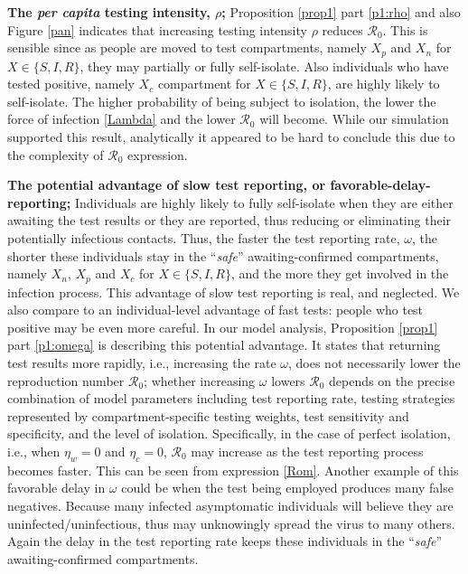 \documentclass[12pt]{article}
\newcommand{\percap}{\emph{per capita}\xspace}
\newcommand{\Rnum}{\mathcal{R}_0}
\theoremstyle{definition} %
\begin{document}
{\bf The \percap testing intensity, $\rho$;}
Proposition \ref{prop1} part \ref{p1:rho} and also Figure \ref{pan} indicates that increasing testing intensity $\rho$ reduces $\Rnum$. This is sensible since as people are moved to test compartments, namely $X_p$ and $X_n$ for $X \in \{S,I,R\}$, they may partially or fully self-isolate. Also individuals who have tested positive, namely $X_c$ compartment for $X \in \{S,I,R\}$, are highly likely to self-isolate. The higher probability of being subject to isolation, the lower the force of infection \eqref{Lambda} and the lower $\Rnum$ will become. While our simulation supported this result, analytically it appeared to be hard to conclude this due to the complexity of $\Rnum$ expression.  

{\bf The potential advantage of slow test reporting, or favorable-delay-reporting;}
Individuals are highly likely to fully self-isolate when they are either awaiting the test results or they are reported, thus reducing or eliminating their potentially infectious contacts. Thus, the faster the test reporting rate, $\omega$, the shorter these individuals stay in the ``\emph {safe}'' awaiting-confirmed compartments, namely $X_n$, $X_p$ and $X_c$ for $X \in \{S,I,R\}$, and the more they get involved in the infection process.
This advantage of slow test reporting is real, and neglected. 
We also compare to an individual-level advantage of fast tests: people who test positive may be even more careful.
In our model analysis, Proposition \ref{prop1} part \ref{p1:omega} is describing this potential advantage. 
It states that returning test results more rapidly, i.e., increasing the rate $\omega$, does not necessarily lower the reproduction number $\Rnum$; whether increasing $\omega$ lowers $\Rnum$ depends on the precise combination of model parameters  including test reporting rate, testing strategies represented by compartment-specific testing weights, test sensitivity and specificity, and the level of isolation. 
Specifically, in the case of perfect isolation, i.e., when $\eta_w=0$ and $\eta_c=0$, $\Rnum$ may increase as the test reporting process becomes faster. This can be seen from expression \eqref{Rom}.
Another example of this favorable delay in $\omega$ could be when the test being employed produces many false negatives. Because many infected asymptomatic individuals will believe they are uninfected/uninfectious, thus may unknowingly spread the virus to many others. Again the delay in the test reporting rate keeps these individuals in the ``\emph {safe}'' awaiting-confirmed compartments.  
\end{document}
